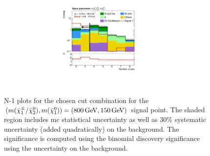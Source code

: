 \begin{figure}
\begin{subfigure}[b]{0.5\linewidth}
		\caption{}
	\end{subfigure}\hfill
	\begin{subfigure}[b]{0.5\linewidth}
		\centering\includegraphics[width=0.7\textwidth]{N-1_cut_scan/n1_800_150/nJet30}
		\caption{}
	\end{subfigure}

	\caption[N-1 plots for the chosen cut combination for the (800, 150) signal point]{N-1 plots for the chosen cut combination for the $(m(\charg/\neutr), m(\lsp)) = (\SI{800}{\GeV}, \SI{150}{\GeV})$ signal point. The shaded region includes \gls{mc} statistical uncertainty as well as 30\% systematic uncertainty (added quadratically) on the background. The significance is computed using the binomial discovery significance using the uncertainty on the background.}
	\label{fig:results_n1_800_150}
\end{figure}


